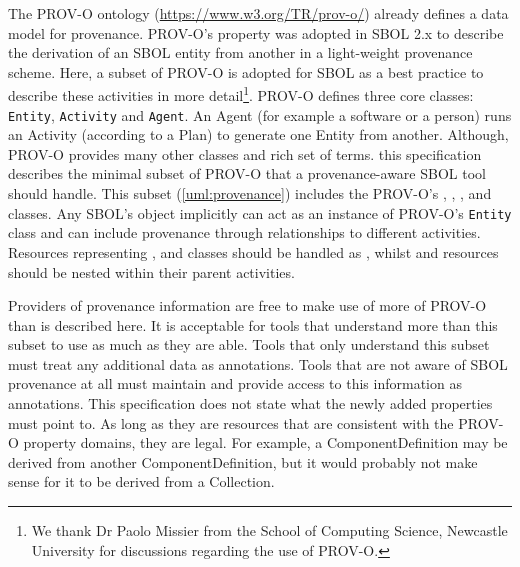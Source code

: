 {The PROV-O ontology (\url{https://www.w3.org/TR/prov-o/}) already defines a data model for provenance. PROV-O's  property was adopted in SBOL 2.x to describe the derivation of an SBOL entity from another in a light-weight provenance scheme.  Here, a subset of PROV-O is adopted for SBOL as a best practice to describe these activities in more detail\footnote{We thank Dr Paolo Missier from the School of Computing Science, Newcastle University for discussions regarding the use of PROV-O.}. PROV-O defines three core classes: \texttt{Entity}, \texttt{Activity} and \texttt{Agent}. An Agent (for example a software or a person) runs an Activity (according to a Plan) to generate one Entity from another. Although, PROV-O provides many other classes and rich set of terms. this specification describes the minimal subset of PROV-O that a provenance-aware SBOL tool should handle. This subset (\ref{uml:provenance}) includes the PROV-O's , , ,  and  classes. Any SBOL's  object implicitly can act as an instance of PROV-O's \texttt{Entity} class and can include provenance through relationships to different activities. Resources representing ,  and  classes should be handled as , whilst  and  resources should be nested within their parent activities. 


Providers of provenance information are free to make use of more of PROV-O than is described here. It is acceptable for tools that understand more than this subset to use as much as they are able. Tools that only understand this subset must treat any additional data as annotations. Tools that are not aware of SBOL provenance at all must maintain and provide access to this information as annotations. This specification does not state what the newly added properties must point to. As long as they are resources that are consistent with the PROV-O property domains, they are legal. For example, a ComponentDefinition may be derived from another ComponentDefinition, but it would probably not make sense for it to be derived from a Collection.
}

